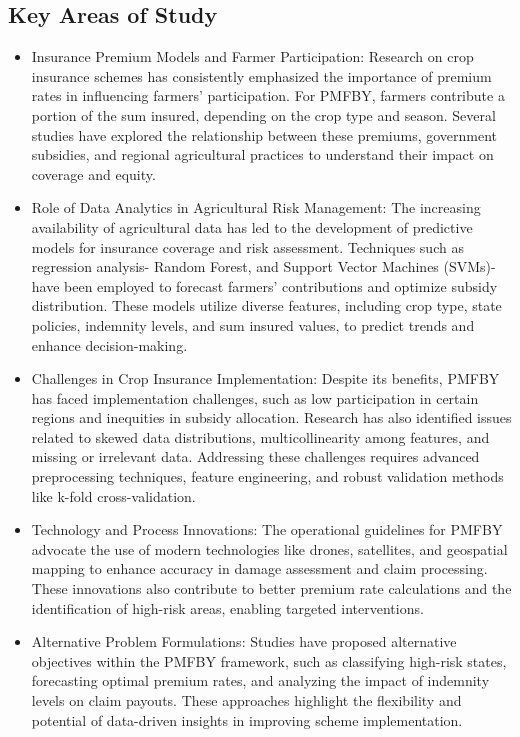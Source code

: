\documentclass[12pt]{article}
\begin{document}
\subsection{Key Areas of Study}
\begin{itemize}	
\item{Insurance Premium Models and Farmer Participation: Research on crop insurance schemes has consistently emphasized the importance of premium rates 
in influencing farmers' participation. For PMFBY, farmers contribute a portion of the sum insured, depending on the crop type and season. Several studies have explored
 the relationship between these premiums, government subsidies, and regional agricultural practices to understand their impact on coverage and equity.}
\item{Role of Data Analytics in Agricultural Risk Management: The increasing availability of agricultural data has led to the development of predictive models for insurance
 coverage and risk assessment. Techniques such as regression analysis- Random Forest, and Support Vector Machines (SVMs)- have been employed to forecast farmers' contributions
 and optimize subsidy distribution. These models utilize diverse features, including crop type, state policies, indemnity levels, and sum insured values, to predict trends and enhance decision-making.}
\item{Challenges in Crop Insurance Implementation: Despite its benefits, PMFBY has faced implementation challenges, such as low participation in certain regions and inequities 
in subsidy allocation. Research has also identified issues related to skewed data distributions, multicollinearity among features, and missing or irrelevant data. Addressing these
 challenges requires advanced preprocessing techniques, feature engineering, and robust validation methods like k-fold cross-validation.}
\item{Technology and Process Innovations: The operational guidelines for PMFBY advocate the use of modern technologies like drones, satellites, and geospatial mapping to 
enhance accuracy in damage assessment and claim processing. These innovations also contribute to better premium rate calculations and the identification of high-risk areas, enabling targeted interventions.}
\item{Alternative Problem Formulations: Studies have proposed alternative objectives within the PMFBY framework, such as classifying high-risk states, forecasting optimal 
premium rates, and analyzing the impact of indemnity levels on claim payouts. These approaches highlight the flexibility and potential of data-driven insights in improving scheme implementation.}
\end{itemize}
\end{document}
